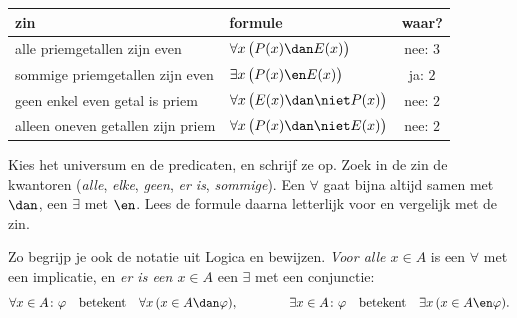 \begin{center}\renewcommand{\arraystretch}{1.3}
\begin{tabular}{|l|l|c|}\hline
\rowcolor{accent!14} zin & formule & waar? \\ \hline
alle priemgetallen zijn even & $\forall x\, \bigl(P(x) \dan E(x)\bigr)$ & nee: $3$ \\ \hline
sommige priemgetallen zijn even & $\exists x\, \bigl(P(x) \en E(x)\bigr)$ & ja: $2$ \\ \hline
geen enkel even getal is priem & $\forall x\, \bigl(E(x) \dan \niet P(x)\bigr)$ & nee: $2$ \\ \hline
alleen oneven getallen zijn priem & $\forall x\, \bigl(P(x) \dan \niet E(x)\bigr)$ & nee: $2$ \\ \hline
\end{tabular}
\end{center}


\begin{werkwijze}
Kies het universum en de predicaten, en schrijf ze op. Zoek in de zin de kwantoren (\textit{alle}, \textit{elke}, \textit{geen}, \textit{er is}, \textit{sommige}). Een $\forall$ gaat bijna altijd samen met $\dan$, een $\exists$ met $\en$. Lees de formule daarna letterlijk voor en vergelijk met de zin.
\end{werkwijze}

Zo begrijp je ook de notatie uit Logica en bewijzen. \textit{Voor alle $x \in A$} is een $\forall$ met een implicatie, en \textit{er is een $x \in A$} een $\exists$ met een conjunctie:
\[\forall x \in A\colon \varphi \quad \text{betekent} \quad \forall x\, (x \in A \dan \varphi), \qquad\qquad \exists x \in A\colon \varphi \quad \text{betekent} \quad \exists x\, (x \in A \en \varphi).\]

